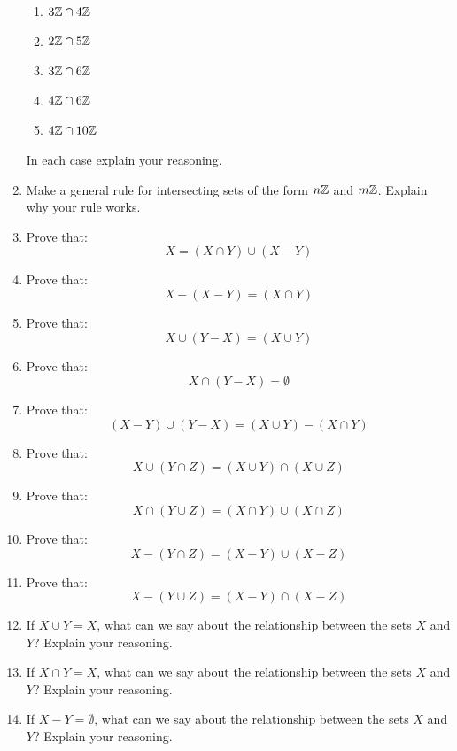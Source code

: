 \begin{problems}
\begin{enumerate}
\begin{enumerate}
\item $3\mathbb Z\cap 4\mathbb Z$
\item $2\mathbb Z\cap 5\mathbb Z$
\item $3\mathbb Z\cap 6\mathbb Z$
\item $4\mathbb Z\cap 6\mathbb Z$
\item $4\mathbb Z\cap 10\mathbb Z$
\end{enumerate}
In each case explain your reasoning. 
\item Make a general rule for intersecting sets of the form $n\mathbb Z$ and
  $m\mathbb Z$. Explain why your rule works.
\item Prove that:
\[
X = (X\cap Y) \cup (X-Y)
\]
\item Prove that:
\[
X-(X-Y) = (X\cap Y)
\]
\item Prove that:
\[
X \cup (Y-X) = (X\cup Y)
\]
\item Prove that:
\[
X \cap (Y-X) = \emptyset
\]
\item Prove that:
\[
(X-Y)\cup (Y-X) = (X\cup Y)-(X\cap Y)
\]
\item Prove that:
\[
X\cup (Y \cap Z) = (X \cup Y)\cap (X \cup Z)
\]
\item Prove that:
\[
X\cap (Y \cup Z) = (X \cap Y)\cup (X \cap Z)
\]
\item Prove that:
\[
X - (Y \cap Z) = (X -Y)\cup (X - Z)
\]
\item Prove that:
\[
X - (Y \cup Z) = (X -Y)\cap (X -Z)
\]
\item If $X\cup Y = X$, what can we say about the relationship between the sets $X$ and $Y$? Explain your reasoning.
\item If $X\cap Y = X$, what can we say about the relationship between the sets $X$ and $Y$? Explain your reasoning.
\item If $X-Y =\emptyset$, what can we say about the relationship between the sets $X$ and $Y$? Explain your reasoning.
\end{enumerate}
\end{problems}


\newpage



